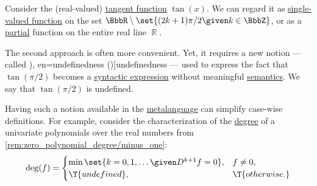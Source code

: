 \begin{concept}\label{con:undefinedness}\mimprovised
  Consider the (real-valued) \hyperref[def:derived_trigonometric_functions/tan]{tangent function} \( \tan(x) \). We can regard it as \hyperref[def:function]{single-valued function} on the set \( \BbbR \setminus \set{ (2k + 1) \pi / 2 \given k \in \BbbZ } \), or as a \hyperref[def:partial_function]{partial} function on the entire real line \( \BbbR \).

  The second approach is often more convenient. Yet, it requires a new notion --- called \term[ru=неопределённость (\cite[62]{ШеньВерещагин2020НачалаТеорииМножеств}), en=undefinedness (\cite[284]{Farmer2008STTVirtues})]{undefinedness} --- used to express the fact that \( \tan(\pi / 2) \) becomes a \hyperref[con:expression]{syntactic expression} without meaningful \hyperref[con:syntax_semantics_duality]{semantics}. We say that \( \tan(\pi / 2) \) is undefined.

  Having such a notion available in the \hyperref[con:metalanguage]{metalanguage} can simplify case-wise definitions. For example, consider the characterization of the \hyperref[def:polynomial_degree]{degree} of a univariate polynomials over the real numbers from \cref{rem:zero_polynomial_degree/minus_one}:
  \begin{equation*}
    \deg(f) = \begin{cases}
      \min\set{ k = 0, 1, \ldots \given D^{k+1} f = 0 }, &f \neq 0, \\
      \T{undefined},                                     &\T{otherwise.}
    \end{cases}
  \end{equation*}
\end{concept}
